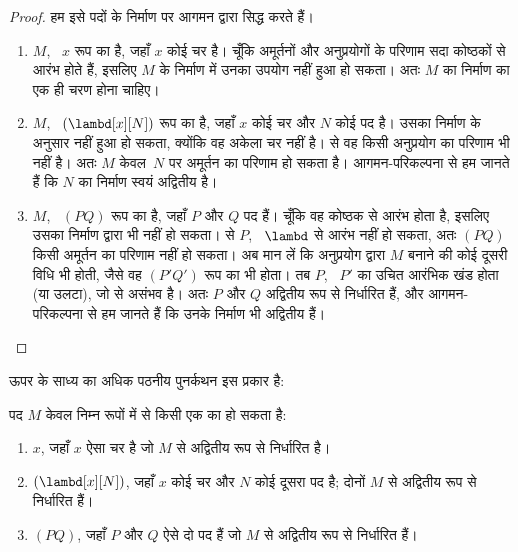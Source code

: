 \documentclass[../../../include/open-logic-section]{subfiles}
\begin{document}
\begin{proof}
  हम इसे पदों के निर्माण पर आगमन द्वारा सिद्ध करते हैं।
  \begin{enumerate}
    \item $M$, ~$x$ रूप का है, जहाँ $x$ कोई चर है। चूँकि अमूर्तनों और
      अनुप्रयोगों के परिणाम सदा कोष्ठकों से आरंभ होते हैं, इसलिए $M$ के
      निर्माण में उनका उपयोग नहीं हुआ हो सकता। अतः $M$ का निर्माण
       का एक ही चरण होना
      चाहिए।
    \item $M$, ~$(\lambd[x][N])$ रूप का है, जहाँ $x$ कोई चर और $N$ कोई
      पद है। उसका निर्माण
       के अनुसार नहीं हुआ
      हो सकता, क्योंकि वह अकेला चर नहीं है।  से वह
      किसी अनुप्रयोग का परिणाम भी नहीं है। अतः $M$ केवल~$N$ पर अमूर्तन का
      परिणाम हो सकता है। आगमन-परिकल्पना से हम जानते हैं कि $N$ का निर्माण
      स्वयं अद्वितीय है।
    \item $M$, ~$(PQ)$ रूप का है, जहाँ $P$ और $Q$ पद हैं। चूँकि वह कोष्ठक
      से आरंभ होता है, इसलिए उसका निर्माण
       द्वारा भी नहीं हो
      सकता।  से $P$, ~$\lambd$ से आरंभ नहीं हो
      सकता, अतः $(PQ)$ किसी अमूर्तन का परिणाम नहीं हो सकता। अब मान लें कि
      अनुप्रयोग द्वारा $M$ बनाने की कोई दूसरी विधि भी होती, जैसे वह
      $(P'Q')$ रूप का भी होता। तब $P$, ~$P'$ का उचित आरंभिक खंड होता (या
      उलटा), जो  से असंभव है। अतः $P$ और $Q$ अद्वितीय
      रूप से निर्धारित हैं, और आगमन-परिकल्पना से हम जानते हैं कि उनके
      निर्माण भी अद्वितीय हैं।
  \end{enumerate}
\end{proof}

ऊपर के साध्य का अधिक पठनीय पुनर्कथन इस प्रकार है:
\begin{prop}
  पद $M$ केवल निम्न रूपों में से किसी एक का हो सकता है:
  \begin{enumerate}
    \item $x$, जहाँ $x$ ऐसा चर है जो $M$ से अद्वितीय रूप से निर्धारित है।
    \item $(\lambd[x][N])$, जहाँ $x$ कोई चर और $N$ कोई दूसरा पद है; दोनों
      $M$ से अद्वितीय रूप से निर्धारित हैं।
    \item $(PQ)$, जहाँ $P$ और $Q$ ऐसे दो पद हैं जो $M$ से अद्वितीय रूप से
      निर्धारित हैं।
  \end{enumerate}
\end{prop}
\end{document}
